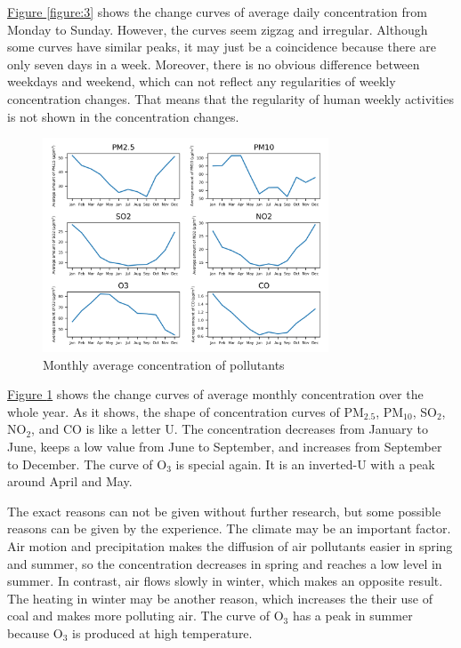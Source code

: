 \documentclass[letterpaper]{article}
\begin{document}
\begin{CJK*}{UTF8}{gkai}
  \hyperref[figure:3]{Figure \ref*{figure:3}} shows the change curves of average daily concentration from Monday to Sunday. However, the curves seem zigzag and irregular. Although some curves have similar peaks, it may just be a coincidence because there are only seven days in a week. Moreover, there is no obvious difference between weekdays and weekend, which can not reflect any regularities of weekly concentration changes. That means that the regularity of human weekly activities is not shown in the concentration changes.

  \begin{figure}[h]
    \includegraphics[width = 8.5cm]{monavg_pltn.png}
    \caption{Monthly average concentration of pollutants}
    \label{figure:4}
  \end{figure}

  \hyperref[figure:4]{Figure \ref*{figure:4}} shows the change curves of average monthly concentration over the whole year. As it shows, the shape of concentration curves of PM$_{2.5}$, PM$_{10}$, SO$_{2}$, NO$_{2}$, and CO is like a letter U. The concentration decreases from January to June, keeps a low value from June to September, and increases from September to December. The curve of O$_{3}$ is special again. It is an inverted-U with a peak around April and May.

  The exact reasons can not be given without further research, but some possible reasons can be given by the experience. The climate may be an important factor. Air motion and precipitation makes the diffusion of air pollutants easier in spring and summer, so the concentration decreases in spring and reaches a low level in summer. In contrast, air flows slowly in winter, which makes an opposite result. The heating in winter may be another reason, which increases the their use of coal and makes more polluting air. The curve of O$_{3}$ has a peak in summer because O$_{3}$ is produced at high temperature.


\end{CJK*}
\end{document}
